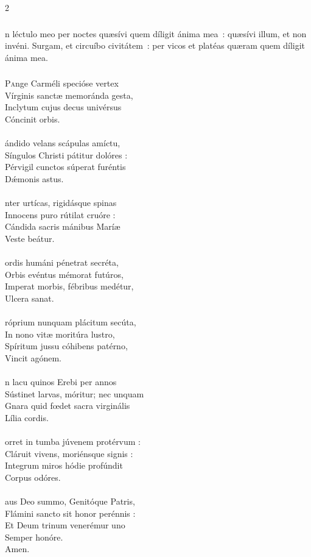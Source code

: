 \documentclass[9pt,twoside]{extarticle}
\begin{document}
\begin{multicols}{2}
{{\subsubsection*{}
n léctulo meo per noctes quæsívi quem díligit ánima mea~: quæsívi illum, et non invéni. Surgam, et circuíbo civitátem~: per vicos et platéas quæram quem díligit ánima mea.

\subsubsection*{\center {}}
\lettrine{P}ange Carméli specióse vertex\\
Vírginis sanctæ memoránda gesta,\\
Inclytum cujus decus univérsus\\
Cóncinit orbis.\\
\\
ándido velans scápulas amíctu,\\
Síngulos Christi pátitur dolóres :\\
Pérvigil cunctos súperat furéntis\\
Dǽmonis astus.\\
\\
nter urtícas, rigidásque spinas\\
Innocens puro rútilat cruóre :\\
Cándida sacris mánibus Maríæ\\
Veste beátur.\\
\\
ordis humáni pénetrat secréta,\\
Orbis evéntus mémorat futúros,\\
Imperat morbis, fébribus medétur,\\
Ulcera sanat.\\
\\
róprium nunquam plácitum secúta,\\
In nono vitæ moritúra lustro,\\
Spíritum jussu cóhibens patérno,\\
Vincit agónem.\\
\\
n lacu quinos Erebi per annos\\
Sústinet larvas, móritur; nec unquam\\
Gnara quid fœdet sacra virginális\\
Lília cordis.\\
\\
orret in tumba júvenem protérvum :\\
Cláruit vivens, moriénsque signis :\\
Integrum miros hódie profúndit\\
Corpus odóres.\\
\\
aus Deo summo, Genitóque Patris,\\
Flámini sancto sit honor perénnis :\\
Et Deum trinum venerémur uno\\
Semper honóre.\\
Amen.

}}
\end{multicols}
\end{document}
